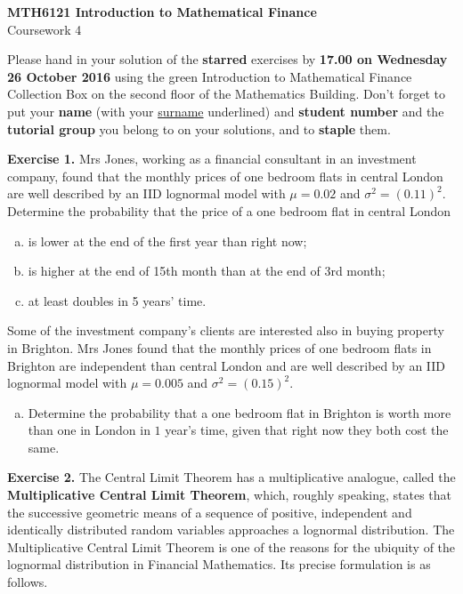 \documentclass[11pt,a4paper]{report}
\begin{document}
\begin{center}
	\LARGE\textbf{MTH6121 Introduction to Mathematical Finance}\\
	Coursework 4
\end{center}
Please hand in your solution of the \textbf{starred} exercises by \textbf{17.00 on Wednesday 26 October 2016} using the green Introduction to Mathematical Finance Collection Box on the second floor of the Mathematics Building. Don’t forget to put your \textbf{name} (with your \underline{surname} underlined) and \textbf{student number} and the \textbf{tutorial group} you belong to on your solutions, and to \textbf{staple} them.\par
\textbf{Exercise 1.} Mrs Jones, working as a financial consultant in an investment company, found that the monthly prices of one bedroom flats in central London are well described by an IID lognormal model with $\mu = 0.02$ and $\sigma^2 = (0.11)^2$. Determine the probability that the price of a one bedroom flat in central London
\begin{enumerate}[(a)]
    \item is lower at the end of the first year than right now;
    \item is higher at the end of 15th month than at the end of 3rd month;
    \item at least doubles in 5 years’ time.
\end{enumerate}
Some of the investment company’s clients are interested also in buying property in Brighton. Mrs Jones found that the monthly prices of one bedroom flats in Brighton are independent than central London and are well described by an IID lognormal model with $\mu = 0.005$ and $\sigma^2 = (0.15)^2$.
\begin{enumerate}[(d)]
    \item Determine the probability that a one bedroom flat in Brighton is worth more than one in London in $1$ year’s time, given that right now they both cost the same.
\end{enumerate}
\textbf{Exercise 2.} The Central Limit Theorem has a multiplicative analogue, called the \textbf{Multiplicative Central Limit Theorem}, which, roughly speaking, states that the successive geometric means of a sequence of positive, independent and identically distributed random variables approaches a lognormal distribution. The Multiplicative Central Limit Theorem is one of the reasons for the ubiquity of the lognormal distribution in Financial Mathematics. Its precise formulation is as follows.\par
\end{document}
